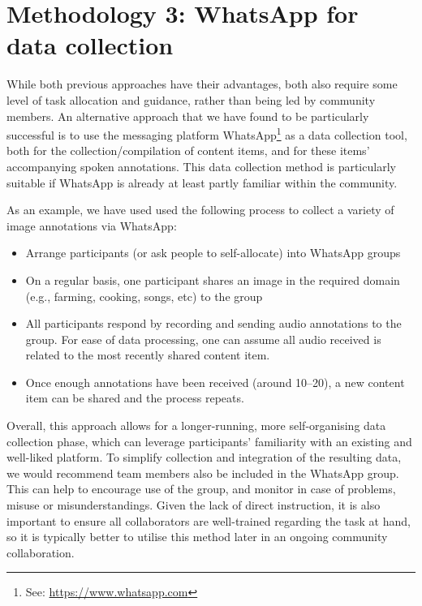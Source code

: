 \documentclass[10pt,twoside,openright]{report}
\begin{document}
\section{Methodology 3: WhatsApp for data collection}
While both previous approaches have their advantages, both also require some level of task allocation and guidance, rather than being led by community members.
An alternative approach that we have found to be particularly successful is to use the messaging platform WhatsApp\footnote{See: \url{https://www.whatsapp.com}} as a data collection tool, both for the collection/compilation of content items, and for these items' accompanying spoken annotations.
This data collection method is particularly suitable if WhatsApp is already at least partly familiar within the community.

As an example, we have used used the following process to collect a variety of image annotations via WhatsApp:
\begin{itemize}
    \item Arrange participants (or ask people to self-allocate) into \mbox{WhatsApp} groups
    \item On a regular basis, one participant shares an image in the required domain (e.g., farming, cooking, songs, etc) to the group 
    \item All participants respond by recording and sending audio annotations to the group. %
    For ease of data processing, one can assume all audio received is related to the most recently shared content item.
    \item Once enough annotations have been received (around 10--20), a new  content item can be shared and the process repeats.     
\end{itemize}

Overall, this approach allows for a longer-running, more self-organising data collection phase, which can leverage participants' familiarity with an existing and well-liked platform.
To simplify collection and integration of the resulting data, we would recommend team members also be included in the WhatsApp group.
This can help to encourage use of the group, and monitor in case of problems, misuse or misunderstandings. 
Given the lack of direct instruction, it is also important to ensure all collaborators are well-trained regarding the task at hand, so it is typically better to utilise this method later in an ongoing community collaboration.


\makeatletter
\@openrightfalse
\makeatother
\end{document}
